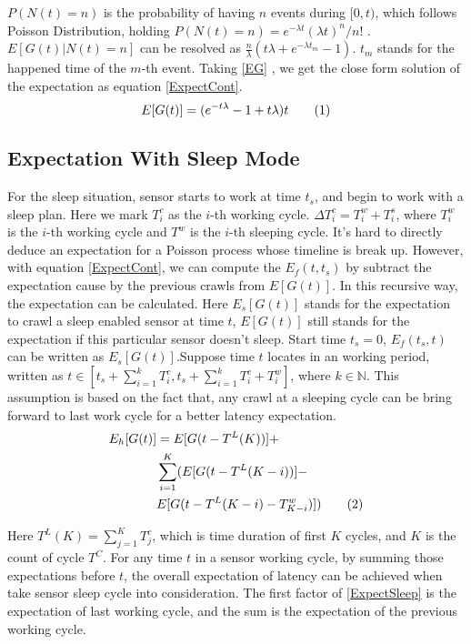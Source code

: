 \documentclass[conference]{IEEEtran}
\newcommand\numberthis{\addtocounter{equation}{1}\tag{\theequation}}
\begin{document}
$P(N(t)=n)$ is the probability of having $n$ events during $[0,t)$, which follows Poisson Distribution, holding $P(N(t)=n)=e^{-\lambda t}{(\lambda t)^n}/{n!}$ . $E[G(t)|N(t)=n]$ can be resolved as $\frac{n}{\lambda}(t\lambda+e^{-\lambda t_m}-1)$. $t_{m}$ stands for the happened time of the $m$-th event. Taking \eqref{EG} , we get the close form solution of the expectation as equation \eqref{ExpectCont}.
\begin{equation}
E[G(t)] = (e^{-t\lambda}-1+t \lambda)t \numberthis \label{ExpectCont}
\end{equation}

\subsection{Expectation With Sleep Mode}
For the sleep situation, sensor starts to work at time $t_s$, and begin to work with a sleep plan.
Here we mark $T^{c}_{i}$ as the $i$-th working cycle. $\Delta T^{c}_{i} = T^{w}_{i}+T^{s}_{i}$, where $T^{w}_{i}$ is the $i$-th working cycle and $T^{w}$ is the $i$-th sleeping cycle. 
It's hard to directly deduce an expectation for a Poisson process whose timeline is break up. However, with equation \eqref{ExpectCont}, we can compute the $E_f(t, t_s)$ by subtract the expectation cause by the previous crawls from $E[G(t)]$. In this recursive way, the expectation can be calculated. Here $E_s[G(t)]$ stands for the expectation to crawl a sleep enabled sensor at time $t$, $E[G(t)]$ still stands for the expectation if this particular sensor doesn't sleep.
Start time $t_s=0$, $E_f(t_s,t)$ can be written as $E_s[G(t)]$.Suppose time $t$ locates in an working period, written as $t \in [t_s + \sum_{i=1}^{k} T^{c}_{i}, t_s + \sum_{i=1}^{k} T^{c}_{i} + T^{w}_{i}]$, where $k\in\mathbb{N}$. This assumption is based on the fact that, any crawl at a sleeping cycle can be bring forward to last work cycle for a better latency expectation.
\begin{align*}
E_h[G(t)] & = E[G(t-T^{L}(K))] + \\
	& \sum_{i=1}^{K}(E[G(t-T^{L}(K-i))]-\\
	& E[G(t-T^{L}(K-i)-T^{w}_{K-i})]) \numberthis \label{ExpectSleep}
\end{align*}

Here $T^{L}(K) = \sum_{j=1}^{K} T^{c}_{j}$, which is time duration of first $K$ cycles, and $K$ is the count of cycle $T^{C}$. 
For any time $t$ in a sensor working cycle, by summing those expectations before $t$, the overall expectation of latency can be achieved when take sensor sleep cycle into consideration. The first factor of \eqref{ExpectSleep} is the expectation of last working cycle, and the sum is the expectation of the previous working cycle.
\end{document}
